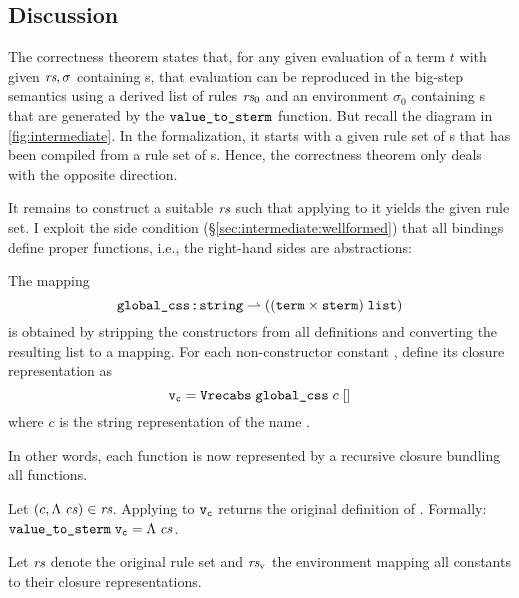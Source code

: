 \subsection{Discussion}
\label{sec:intermediate:value:sublocale}

The correctness theorem states that, for any given evaluation of a term $t$ with given $\textit{rs}, \sigma$ containing s, that evaluation can be reproduced in the big-step semantics using a derived list of rules $\textit{rs}_0$ and an environment $\sigma_0$ containing s that are generated by the $\texttt{\textup{value\_to\_sterm}}$ function.
But recall the diagram in \cref{fig:intermediate}.
In the formalization, it starts with a given rule set of s that has been compiled from a rule set of s.
Hence, the correctness theorem only deals with the opposite direction.

It remains to construct a suitable $\textit{rs}$ such that applying  to it yields the given  rule set.
I exploit the side condition (§\ref{sec:intermediate:wellformed}) that all bindings define proper functions, i.e., the right-hand sides are abstractions:

\begin{definition}\label{def:intermediate:value:global}
  The mapping
  \[ \texttt{\textup{global\_css}} \mathbin{:\!\!:} \texttt{\textup{string}} \rightharpoonup ((\texttt{\textup{term}} \times \texttt{\textup{sterm}})\;\texttt{\textup{list}}) \]
  is obtained by stripping the  constructors from all definitions and converting the resulting list to a mapping.
  For each non-constructor constant , define its closure representation as
  \[ \texttt{\textup{v}}_{\texttt{\textup{c}}} = \texttt{\textup{Vrecabs}}\; \texttt{\textup{global\_css}} \;c\;[] \]
  where $c$ is the string representation of the name .
\end{definition}

\noindent
In other words, each function is now represented by a recursive closure bundling all functions.

\begin{lemma}
  Let $(c, \Lambda\;\mathit{cs})\in\textit{rs}$.
  Applying  to $\texttt{\textup{v}}_{\texttt{\textup{c}}}$ returns the original definition of .
  Formally: $\texttt{\textup{value\_to\_sterm}}\;\texttt{\textup{v}}_{\texttt{\textup{c}}} = \Lambda\;\mathit{cs}$.
\end{lemma}

\noindent
Let $\textit{rs}$ denote the original  rule set and $\textit{rs}_\text{v}$ the environment mapping all constants to their closure representations.


